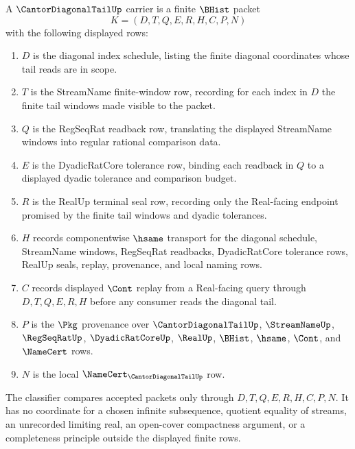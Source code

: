 \begin{definition}
\label{def:cantor-diagonal-tail-carrier}
A $\CantorDiagonalTailUp$ carrier is a finite $\BHist$ packet
$$
K=(D,T,Q,E,R,H,C,P,N)
$$
with the following displayed rows:
\begin{enumerate}
\item $D$ is the diagonal index schedule, listing the finite diagonal coordinates whose tail reads are in scope.
\item $T$ is the StreamName finite-window row, recording for each index in $D$ the finite tail windows made visible to the packet.
\item $Q$ is the RegSeqRat readback row, translating the displayed StreamName windows into regular rational comparison data.
\item $E$ is the DyadicRatCore tolerance row, binding each readback in $Q$ to a displayed dyadic tolerance and comparison budget.
\item $R$ is the RealUp terminal seal row, recording only the Real-facing endpoint promised by the finite tail windows and dyadic tolerances.
\item $H$ records componentwise $\hsame$ transport for the diagonal schedule, StreamName windows, RegSeqRat readbacks, DyadicRatCore tolerance rows, RealUp seals, replay, provenance, and local naming rows.
\item $C$ records displayed $\Cont$ replay from a Real-facing query through $D,T,Q,E,R,H$ before any consumer reads the diagonal tail.
\item $P$ is the $\Pkg$ provenance over $\CantorDiagonalTailUp$, $\StreamNameUp$, $\RegSeqRatUp$, $\DyadicRatCoreUp$, $\RealUp$, $\BHist$, $\hsame$, $\Cont$, and $\NameCert$ rows.
\item $N$ is the local $\NameCert_{\CantorDiagonalTailUp}$ row.
\end{enumerate}
The classifier compares accepted packets only through $D,T,Q,E,R,H,C,P,N$. It has no coordinate for a chosen infinite subsequence, quotient equality of streams, an unrecorded limiting real, an open-cover compactness argument, or a completeness principle outside the displayed finite rows.
\end{definition}

